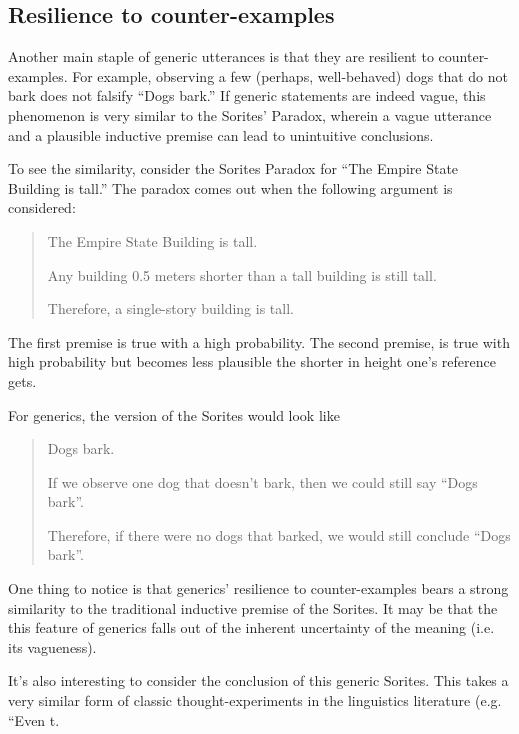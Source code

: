 \documentclass[10pt,letterpaper]{article}
\begin{document}
\subsection{Resilience to counter-examples}

Another main staple of generic utterances is that they are resilient to counter-examples. 
For example, observing a few (perhaps, well-behaved) dogs that do not bark does not falsify ``Dogs bark.'' 
If generic statements are indeed vague, this phenomenon is very similar to the Sorites' Paradox, wherein a vague utterance and a plausible inductive premise can lead to unintuitive conclusions.

To see the similarity, consider the Sorites Paradox for ``The Empire State Building is tall.'' The paradox comes out when the following argument is considered:

\begin{quotation}

The Empire State Building is tall.

Any building 0.5 meters shorter than a tall building is still tall.

Therefore, a single-story building is tall.

\end{quotation} 

The first premise is true with a high probability. 
The second premise, is true with high probability but becomes less plausible the shorter in height one's reference gets. 

For generics, the version of the Sorites would look like

\begin{quotation}
Dogs bark. 

If we observe one dog that doesn't bark, then we could still say ``Dogs bark''. 

Therefore, if there were no dogs that barked, we would still conclude ``Dogs bark''.
\end{quotation} 

One thing to notice is that generics' resilience to counter-examples bears a strong similarity to the traditional inductive premise of the Sorites. 
It may be that the this feature of generics falls out of the inherent uncertainty of the meaning (i.e. its vagueness).

It's also interesting to consider the conclusion of this generic Sorites. 
This takes a very similar form of classic thought-experiments in the linguistics literature (e.g. ``Even t.
\end{document}
